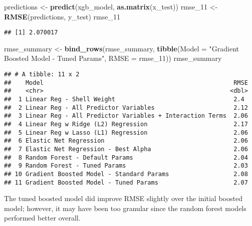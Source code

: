 \documentclass[
]{article}
\newenvironment{Shaded}{\begin{snugshade}}{\end{snugshade}}
\newcommand{\AttributeTok}[1]{\textcolor[rgb]{0.13,0.29,0.53}{#1}}
\newcommand{\FunctionTok}[1]{\textcolor[rgb]{0.13,0.29,0.53}{\textbf{#1}}}
\newcommand{\NormalTok}[1]{#1}
\newcommand{\OtherTok}[1]{\textcolor[rgb]{0.56,0.35,0.01}{#1}}
\newcommand{\StringTok}[1]{\textcolor[rgb]{0.31,0.60,0.02}{#1}}
\begin{document}
\begin{Shaded}
\begin{Highlighting}[]
\NormalTok{predictions }\OtherTok{\textless{}{-}} \FunctionTok{predict}\NormalTok{(xgb\_model, }\FunctionTok{as.matrix}\NormalTok{(x\_test))}
\NormalTok{rmse\_11 }\OtherTok{\textless{}{-}} \FunctionTok{RMSE}\NormalTok{(predictions, y\_test)}
\NormalTok{rmse\_11}
\end{Highlighting}
\end{Shaded}

\begin{verbatim}
## [1] 2.070017
\end{verbatim}

\begin{Shaded}
\begin{Highlighting}[]
\NormalTok{rmse\_summary }\OtherTok{\textless{}{-}} \FunctionTok{bind\_rows}\NormalTok{(rmse\_summary,}
                          \FunctionTok{tibble}\NormalTok{(}\AttributeTok{Model =} \StringTok{"Gradient Boosted Model {-} Tuned Params"}\NormalTok{,}
                                 \AttributeTok{RMSE =}\NormalTok{ rmse\_11))}
\NormalTok{rmse\_summary}
\end{Highlighting}
\end{Shaded}

\begin{verbatim}
## # A tibble: 11 x 2
##    Model                                                     RMSE
##    <chr>                                                    <dbl>
##  1 Linear Reg - Shell Weight                                 2.4 
##  2 Linear Reg - All Predictor Variables                      2.12
##  3 Linear Reg - All Predictor Variables + Interaction Terms  2.06
##  4 Linear Reg w Ridge (L2) Regression                        2.17
##  5 Linear Reg w Lasso (L1) Regression                        2.06
##  6 Elastic Net Regression                                    2.06
##  7 Elastic Net Regression - Best Alpha                       2.06
##  8 Random Forest - Default Params                            2.04
##  9 Random Forest - Tuned Params                              2.03
## 10 Gradient Boosted Model - Standard Params                  2.08
## 11 Gradient Boosted Model - Tuned Params                     2.07
\end{verbatim}

The tuned boosted model did improve RMSE slightly over the initial
boosted model; however, it may have been too granular since the random
forest models performed better overall.
\end{document}
